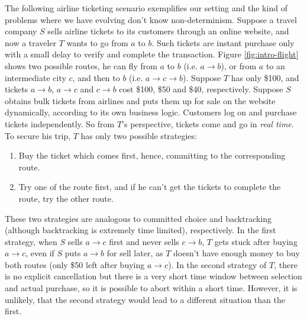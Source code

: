 The following airline ticketing scenario exemplifies our setting 
and the kind of problems where we have evolving don't know non-determinism.
Suppose a travel company $S$ sells airline tickets to its customers through an
online website, and now a traveler $T$ wants to go from $a$ to $b$. 
Such tickets are instant purchase only with a small delay to verify
and complete the transaction.
Figure \ref{fig:intro-flight} shows two possible routes,
he can fly from $a$ to $b$ (i.e. $a\to b$), 
or from $a$ to an intermediate city $c$, and then to $b$ (i.e. $a\to c\to b$).
Suppose $T$ has only \$100, and tickets $a\to b$, $a\to c$ and $c\to b$ 
cost \$100, \$50 and \$40, respectively.
%
Suppose $S$ obtains bulk tickets from airlines and puts them up for sale 
on the website dynamically, according to its own business logic. 
Customers log on and purchase tickets independently. 
So from $T$'s perspective, tickets come and go in {\em real time}. 
To secure his trip, $T$ has only two possible strategies: 
\begin{enumerate}
\item Buy the ticket which comes first, hence, committing to the 
corresponding route.
\item Try one of the route first, and if he can't get the tickets to complete
the route, try the other route.
\end{enumerate}
%
These two strategies are analogous to committed choice and backtracking
(although backtracking is extremely time limited), respectively.
In the first strategy, when $S$ sells $a\to c$ first and never sells $c\to b$, 
$T$ gets stuck after buying $a\to c$, even if $S$ puts $a\to b$ for sell later, 
as $T$ doesn't have enough money to buy both routes (only \$50 left after buying $a\to c$).
In the second strategy of $T$, there is no explicit cancellation but
there is a very short time window between selection
and actual purchase, so it is possible to abort within a short time.
However, it is unlikely, that the second strategy would lead to a different
situation than the first.
%


